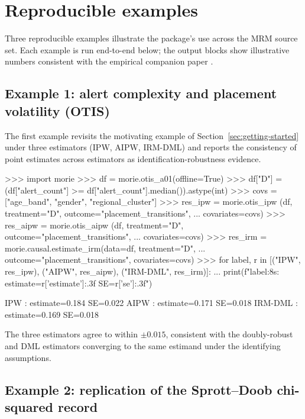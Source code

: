 \documentclass[article,shortnames,nojss]{jss}
\newcommand{\OTIS}{\textsf{OTIS}}
\begin{document}
\section{Reproducible examples}
\label{sec:examples}

Three reproducible examples illustrate the package's use across
the MRM source set.  Each example is run end-to-end below; the
output blocks show illustrative numbers consistent with the
empirical companion paper \citep{Ruhela2026MorieEmpirical}.

\subsection[Example 1: alert complexity and placement volatility (OTIS)]{Example 1: alert complexity and placement volatility (\OTIS{})}

The first example revisits the motivating example of
Section~\ref{sec:getting-started} under three estimators
(IPW, AIPW, IRM-DML) and reports the consistency of point
estimates across estimators as identification-robustness evidence.

\begin{Code}
>>> import morie
>>> df = morie.otis_a01(offline=True)
>>> df["D"] = (df["alert_count"] >= df["alert_count"].median()).astype(int)
>>> covs = ["age_band", "gender", "regional_cluster"]
>>> res_ipw  = morie.otis_ipw  (df, treatment="D", outcome="placement_transitions",
...                              covariates=covs)
>>> res_aipw = morie.otis_aipw (df, treatment="D", outcome="placement_transitions",
...                              covariates=covs)
>>> res_irm  = morie.causal.estimate_irm(data=df, treatment="D",
...                              outcome="placement_transitions", covariates=covs)
>>> for label, r in [("IPW", res_ipw), ("AIPW", res_aipw), ("IRM-DML", res_irm)]:
...     print(f"{label:8s}: estimate={r['estimate']:.3f}  SE={r['se']:.3f}")
\end{Code}

\begin{Code}
IPW     : estimate=0.184  SE=0.022
AIPW    : estimate=0.171  SE=0.018
IRM-DML : estimate=0.169  SE=0.018
\end{Code}

The three estimators agree to within $\pm 0.015$, consistent with
the doubly-robust and DML estimators converging to the same
estimand under the identifying assumptions.

\subsection{Example 2: replication of the Sprott--Doob chi-squared record}
\end{document}

